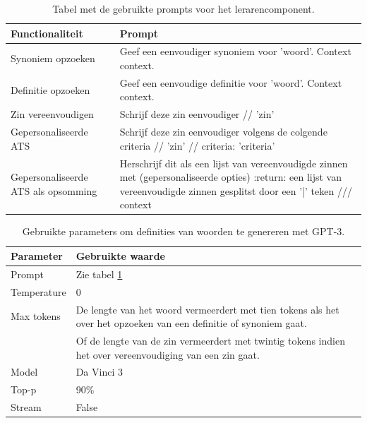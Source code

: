 \begin{center}
	
\end{center}
\begin{table}[H]
	\begin{tabular}{ | m{5cm} | m{10cm} |}
		\hline
		\textbf{Functionaliteit} & \textbf{Prompt} \\ \hline
		Synoniem opzoeken & Geef een eenvoudiger synoniem voor '{woord}'. Context {context}. \\ \hline
		Definitie opzoeken & Geef een eenvoudige definitie voor '{woord}'. Context {context}.\\ \hline
		Zin vereenvoudigen & Schrijf deze zin eenvoudiger // '{zin}'\\ \hline
		Gepersonaliseerde ATS & Schrijf deze zin eenvoudiger volgens de colgende criteria // '{zin}' // criteria: '{criteria}'\\ \hline
		Gepersonaliseerde ATS als opsomming & Herschrijf dit als een lijst van vereenvoudigde zinnen met (gepersonaliseerde opties) :return: een lijst van vereenvoudigde zinnen gesplitst door een '|' teken /// {context}\\ \hline
	\end{tabular}
	\caption{Tabel met de gebruikte prompts voor het lerarencomponent.}
	\label{table:prompts-lerarencomponent}
\end{table}

\begin{center}
	\begin{table}[H]
		\begin{tabular}{| m{5cm}| m{10cm} |}
			\hline
			\textbf{Parameter} & \textbf{Gebruikte waarde} \\ \hline
			Prompt & Zie tabel \ref{table:prompts-lerarencomponent} \\ \hline
			Temperature & 0 \\ \hline
			Max tokens & De lengte van het woord vermeerdert met tien tokens als het over het opzoeken van een definitie of synoniem gaat. \\ 
			& Of de lengte van de zin vermeerdert met twintig tokens indien het over vereenvoudiging van een zin gaat. \\
			\hline
			Model & Da Vinci 3 \\ \hline
			Top-p & 90\% \\ \hline
			Stream & False \\ \hline
		\end{tabular}
		\caption{Gebruikte parameters om definities van woorden te genereren met GPT-3.}
		\label{table:gpt-3-parameters-lerarencomponent}
	\end{table}
\end{center}


